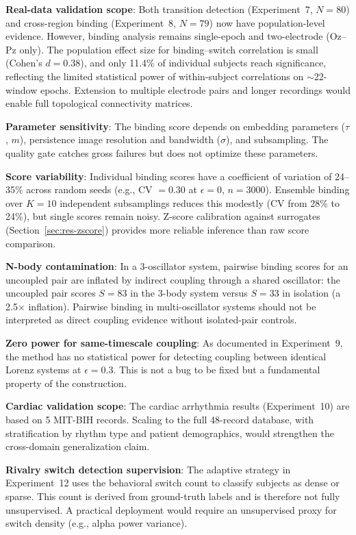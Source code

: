 \documentclass[11pt,a4paper]{article}
\begin{document}
\textbf{Real-data validation scope}: Both transition detection (Experiment~7, $N = 80$) and cross-region binding (Experiment~8, $N = 79$) now have population-level evidence. However, binding analysis remains single-epoch and two-electrode (Oz--Pz only).
The population effect size for binding--switch correlation is small (Cohen's $d = 0.38$), and only 11.4\% of individual subjects reach significance, reflecting the limited statistical power of within-subject correlations on $\sim$22-window epochs.
Extension to multiple electrode pairs and longer recordings would enable full topological connectivity matrices.

\textbf{Parameter sensitivity}: The binding score depends on embedding parameters ($\tau$, $m$), persistence image resolution and bandwidth ($\sigma$), and subsampling.
The quality gate catches gross failures but does not optimize these parameters.

\textbf{Score variability}: Individual binding scores have a coefficient of variation of 24--35\% across random seeds (e.g., CV $= 0.30$ at $\epsilon = 0$, $n = 3000$).
Ensemble binding over $K = 10$ independent subsamplings reduces this modestly (CV from 28\% to 24\%), but single scores remain noisy.
Z-score calibration against surrogates (Section~\ref{sec:res-zscore}) provides more reliable inference than raw score comparison.

\textbf{N-body contamination}: In a 3-oscillator system, pairwise binding scores for an uncoupled pair are inflated by indirect coupling through a shared oscillator: the uncoupled pair scores $S = 83$ in the 3-body system versus $S = 33$ in isolation (a 2.5$\times$ inflation).
Pairwise binding in multi-oscillator systems should not be interpreted as direct coupling evidence without isolated-pair controls.

\textbf{Zero power for same-timescale coupling}: As documented in Experiment~9, the method has no statistical power for detecting coupling between identical Lorenz systems at $\epsilon = 0.3$.
This is not a bug to be fixed but a fundamental property of the construction.

\textbf{Cardiac validation scope}: The cardiac arrhythmia results (Experiment~10) are based on 5 MIT-BIH records.
Scaling to the full 48-record database, with stratification by rhythm type and patient demographics, would strengthen the cross-domain generalization claim.

\textbf{Rivalry switch detection supervision}: The adaptive strategy in Experiment~12 uses the behavioral switch count to classify subjects as dense or sparse.
This count is derived from ground-truth labels and is therefore not fully unsupervised.
A practical deployment would require an unsupervised proxy for switch density (e.g., alpha power variance).
\end{document}
